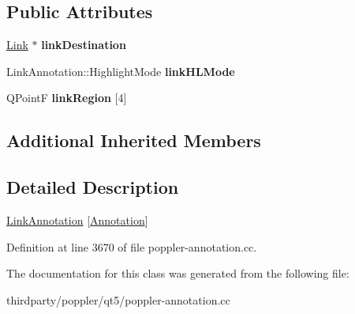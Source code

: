 \subsection*{Public Attributes}
\begin{DoxyCompactItemize}
\item 
\mbox{\label{class_poppler_1_1_link_annotation_private_a93ceca8d02292dc358a9a4f465b9273c}} 
\hyperlink{class_poppler_1_1_link}{Link} $\ast$ {\bfseries link\+Destination}
\item 
\mbox{\label{class_poppler_1_1_link_annotation_private_a4fbb2864be82d6bff211795d52fafa5c}} 
Link\+Annotation\+::\+Highlight\+Mode {\bfseries link\+H\+L\+Mode}
\item 
\mbox{\label{class_poppler_1_1_link_annotation_private_a0d1bd759f49700186dfd4a3cc573cca4}} 
Q\+PointF {\bfseries link\+Region} \mbox{[}4\mbox{]}
\end{DoxyCompactItemize}
\subsection*{Additional Inherited Members}


\subsection{Detailed Description}
\hyperlink{class_poppler_1_1_link_annotation}{Link\+Annotation} \mbox{[}\hyperlink{class_poppler_1_1_annotation}{Annotation}\mbox{]} 

Definition at line 3670 of file poppler-\/annotation.\+cc.



The documentation for this class was generated from the following file\+:\begin{DoxyCompactItemize}
\item 
thirdparty/poppler/qt5/poppler-\/annotation.\+cc\end{DoxyCompactItemize}

